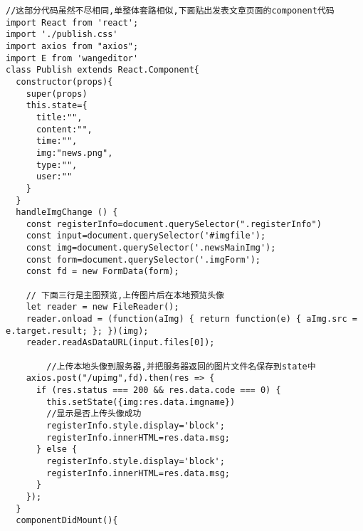 \documentclass[]{article}
\begin{document}
\begin{verbatim}
//这部分代码虽然不尽相同,单整体套路相似,下面贴出发表文章页面的component代码
import React from 'react';
import './publish.css'
import axios from "axios";
import E from 'wangeditor'
class Publish extends React.Component{
  constructor(props){
    super(props)
    this.state={
      title:"",
      content:"",
      time:"",
      img:"news.png",
      type:"",
      user:""
    }
  }
  handleImgChange () {
    const registerInfo=document.querySelector(".registerInfo")
    const input=document.querySelector('#imgfile');
    const img=document.querySelector('.newsMainImg');
    const form=document.querySelector('.imgForm');
    const fd = new FormData(form);

    // 下面三行是主图预览,上传图片后在本地预览头像
    let reader = new FileReader();
    reader.onload = (function(aImg) { return function(e) { aImg.src = e.target.result; }; })(img);
    reader.readAsDataURL(input.files[0]);

		//上传本地头像到服务器,并把服务器返回的图片文件名保存到state中
    axios.post("/upimg",fd).then(res => {
      if (res.status === 200 && res.data.code === 0) {
        this.setState({img:res.data.imgname})
        //显示是否上传头像成功
        registerInfo.style.display='block';
        registerInfo.innerHTML=res.data.msg;
      } else {
        registerInfo.style.display='block';
        registerInfo.innerHTML=res.data.msg;
      }
    });
  }
  componentDidMount(){
    

\end{verbatim}
\end{document}
